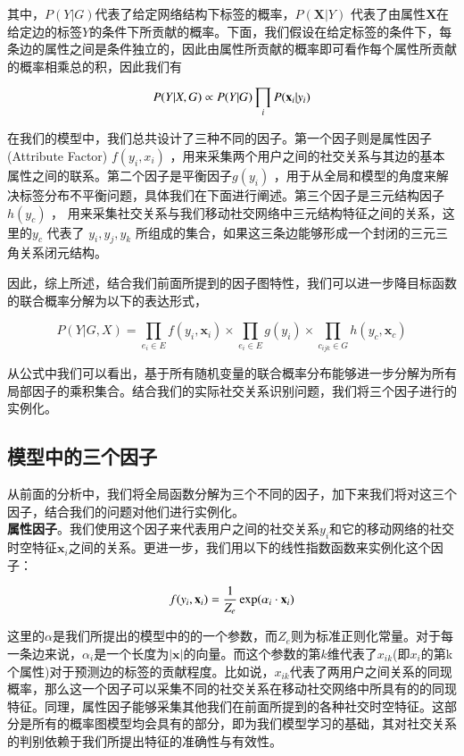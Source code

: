 其中，$P(Y|G)$代表了给定网络结构下标签的概率，$P(\bm{X} | Y)$ 代表了由属性$\bm{X}$在给定边的标签$Y$的条件下所贡献的概率。下面，我们假设在给定标签的条件下，每条边的属性之间是条件独立的，因此由属性所贡献的概率即可看作每个属性所贡献的概率相乘总的积，因此我们有

\begin{equation}
P(Y|X,G) \propto P(Y|G) \prod_i P(\textbf{x}_i | y_i) \\
\end{equation}


在我们的模型中，我们总共设计了三种不同的因子。第一个因子则是属性因子(Attribute Factor) $f(y_i, x_i)$ ，用来采集两个用户之间的社交关系与其边的基本属性之间的联系。第二个因子是平衡因子$g(y_i)$ ，用于从全局和模型的角度来解决标签分布不平衡问题，具体我们在下面进行阐述。第三个因子是三元结构因子$h(y_c)$ ， 用来采集社交关系与我们移动社交网络中三元结构特征之间的关系，这里的$y_c$ 代表了 $y_i, y_j, y_k$ 所组成的集合，如果这三条边能够形成一个封闭的三元三角关系闭元结构。

因此，综上所述，结合我们前面所提到的因子图特性，我们可以进一步降目标函数的联合概率分解为以下的表达形式，

\begin{equation}
\label{eq-sum}
P(Y|G,X) =  \prod_{e_i \in E}f(y_i, \textbf{x}_i) \times \prod_{e_i \in E}g(y_i) \times \prod_{c_{ijk} \in G}h(y_c, \textbf{x}_c)
\end{equation}

从公式中我们可以看出，基于所有随机变量的联合概率分布能够进一步分解为所有局部因子的乘积集合。结合我们的实际社交关系识别问题，我们将三个因子进行的实例化。

\subsection{模型中的三个因子}
从前面的分析中，我们将全局函数分解为三个不同的因子，加下来我们将对这三个因子，结合我们的问题对他们进行实例化。\\

\textbf{属性因子}。我们使用这个因子来代表用户之间的社交关系$y_i$和它的移动网络的社交时空特征$\bm{x}_i$之间的关系。更进一步，我们用以下的线性指数函数来实例化这个因子：

\begin{equation}
\label{eq-attr-factor}
f(y_i, \textbf{x}_i) = \frac{1}{Z_e} \exp(\alpha_i \cdot \textbf{x}_i) \\
\end{equation}

这里的$\alpha$是我们所提出的模型中的的一个参数，而$Z_e$则为标准正则化常量。对于每一条边来说，$\alpha_i$是一个长度为$|\bm{x}|$的向量。而这个参数的第$k$维代表了$x_{ik}$(即$x_i$的第k个属性)对于预测边的标签的贡献程度。比如说，$x_{ik}$代表了两用户之间关系的同现概率，那么这一个因子可以采集不同的社交关系在移动社交网络中所具有的的同现特征。同理，属性因子能够采集其他我们在前面所提到的各种社交时空特征。这部分是所有的概率图模型均会具有的部分，即为我们模型学习的基础，其对社交关系的判别依赖于我们所提出特征的准确性与有效性。\\


